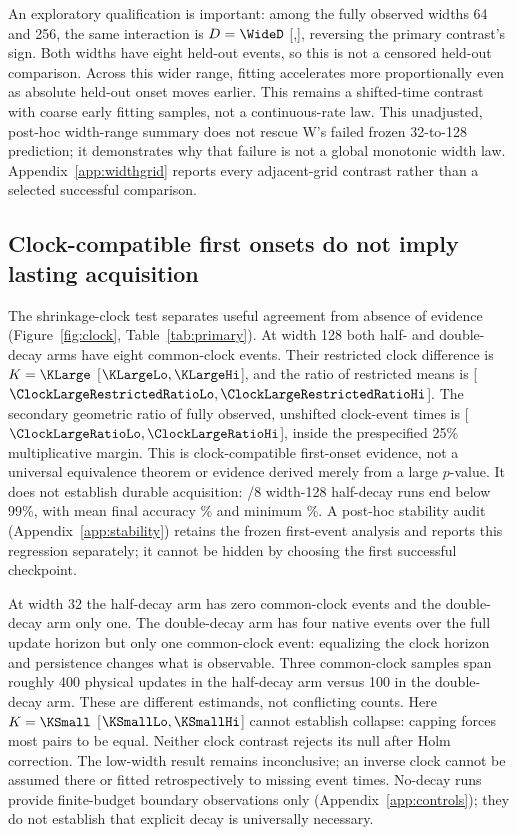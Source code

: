 \documentclass{article}
\begin{document}
An exploratory qualification is important: among the fully observed widths 64 and 256, the same interaction is $D=\WideD$ [\WideDLo,\WideDHi], reversing the primary contrast's sign. Both widths have eight held-out events, so this is not a censored held-out comparison. Across this wider range, fitting accelerates more proportionally even as absolute held-out onset moves earlier. This remains a shifted-time contrast with coarse early fitting samples, not a continuous-rate law. This unadjusted, post-hoc width-range summary does not rescue W's failed frozen 32-to-128 prediction; it demonstrates why that failure is not a global monotonic width law. Appendix~\ref{app:widthgrid} reports every adjacent-grid contrast rather than a selected successful comparison.

\subsection{Clock-compatible first onsets do not imply lasting acquisition}
The shrinkage-clock test separates useful agreement from absence of evidence (Figure~\ref{fig:clock}, Table~\ref{tab:primary}). At width 128 both half- and double-decay arms have eight common-clock events. Their restricted clock difference is $K=\KLarge$ [$\KLargeLo,\KLargeHi$], and the ratio of restricted means is \ClockLargeRestrictedRatio{} [$\ClockLargeRestrictedRatioLo,\ClockLargeRestrictedRatioHi$]. The secondary geometric ratio of fully observed, unshifted clock-event times is \ClockLargeRatio{} [$\ClockLargeRatioLo,\ClockLargeRatioHi$], inside the prespecified 25\% multiplicative margin. This is clock-compatible first-onset evidence, not a universal equivalence theorem or evidence derived merely from a large $p$-value. It does not establish durable acquisition: \HalfLargeRegressions/8 width-128 half-decay runs end below 99\%, with mean final accuracy \HalfLargeFinalMean\% and minimum \HalfLargeFinalMin\%. A post-hoc stability audit (Appendix~\ref{app:stability}) retains the frozen first-event analysis and reports this regression separately; it cannot be hidden by choosing the first successful checkpoint.

At width 32 the half-decay arm has zero common-clock events and the double-decay arm only one. The double-decay arm has four native events over the full update horizon but only one common-clock event: equalizing the clock horizon and persistence changes what is observable. Three common-clock samples span roughly 400 physical updates in the half-decay arm versus 100 in the double-decay arm. These are different estimands, not conflicting counts. Here $K=\KSmall$ [$\KSmallLo,\KSmallHi$] cannot establish collapse: capping forces most pairs to be equal. Neither clock contrast rejects its null after Holm correction. The low-width result remains inconclusive; an inverse clock cannot be assumed there or fitted retrospectively to missing event times. No-decay runs provide finite-budget boundary observations only (Appendix~\ref{app:controls}); they do not establish that explicit decay is universally necessary.
\end{document}
